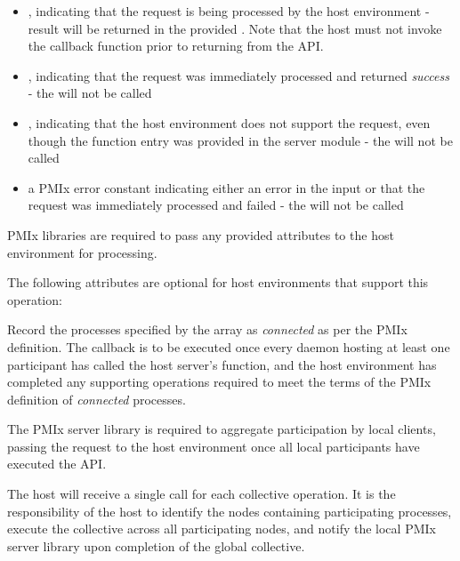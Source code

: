 \begin{itemize}
    \item {}, indicating that the request is being processed by the host environment - result will be returned in the provided . Note that the host must not invoke the callback function prior to returning from the \ac{API}.
    \item {}, indicating that the request was immediately processed and returned \textit{success} - the  will not be called
    \item {}, indicating that the host environment does not support the request, even though the function entry was provided in the server module - the  will not be called
    \item a PMIx error constant indicating either an error in the input or that the request was immediately processed and failed - the  will not be called
\end{itemize}

\reqattrstart
\ac{PMIx} libraries are required to pass any provided attributes to the host environment for processing.
\reqattrend

\optattrstart
The following attributes are optional for host environments that support this operation:


\optattrend

\descr

Record the processes specified by the  array as \textit{connected} as per the \ac{PMIx} definition. The callback is to be executed once every daemon hosting at least one participant has called the host server's  function, and the host environment has completed any supporting operations required to meet the terms of the \ac{PMIx} definition of \textit{connected} processes.

\adviceimplstart
The \ac{PMIx} server library is required to aggregate participation by local clients, passing the request to the host environment once all local participants have executed the \ac{API}.
\adviceimplend

\advicermstart
The host will receive a single call for each collective operation. It is the responsibility of the host to identify the nodes containing participating processes, execute the collective across all participating nodes, and notify the local \ac{PMIx} server library upon completion of the global collective.
\advicermend


